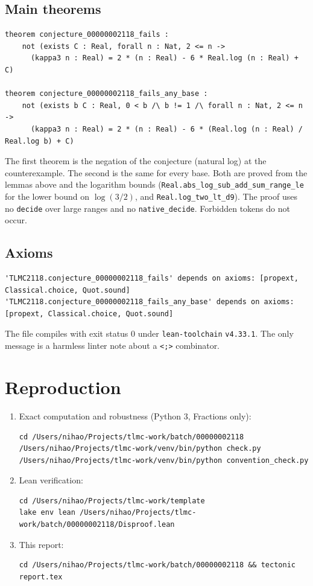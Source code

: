 \documentclass[11pt]{article}
\theoremstyle{definition}
\theoremstyle{plain}
\begin{document}
\subsection*{Main theorems}
\begin{lstlisting}
theorem conjecture_00000002118_fails :
    not (exists C : Real, forall n : Nat, 2 <= n ->
      (kappa3 n : Real) = 2 * (n : Real) - 6 * Real.log (n : Real) + C)

theorem conjecture_00000002118_fails_any_base :
    not (exists b C : Real, 0 < b /\ b != 1 /\ forall n : Nat, 2 <= n ->
      (kappa3 n : Real) = 2 * (n : Real) - 6 * (Real.log (n : Real) / Real.log b) + C)
\end{lstlisting}

\noindent The first theorem is the negation of the conjecture (natural log) at the counterexample. The second is the same
for every base. Both are proved from the lemmas above and the logarithm bounds
(\texttt{Real.abs\_log\_sub\_add\_sum\_range\_le} for the lower bound on $\log(3/2)$, and \texttt{Real.log\_two\_lt\_d9}).
The proof uses no \texttt{decide} over large ranges and no \texttt{native\_decide}. Forbidden tokens do not occur.

\subsection*{Axioms}
\begin{lstlisting}
'TLMC2118.conjecture_00000002118_fails' depends on axioms: [propext, Classical.choice, Quot.sound]
'TLMC2118.conjecture_00000002118_fails_any_base' depends on axioms: [propext, Classical.choice, Quot.sound]
\end{lstlisting}

\noindent The file compiles with exit status 0 under \texttt{lean-toolchain} \texttt{v4.33.1}. The only message is a
harmless linter note about a \texttt{<;>} combinator.

\section{Reproduction}

\begin{enumerate}
\item Exact computation and robustness (Python 3, Fractions only):
\begin{lstlisting}
cd /Users/nihao/Projects/tlmc-work/batch/00000002118
/Users/nihao/Projects/tlmc-work/venv/bin/python check.py
/Users/nihao/Projects/tlmc-work/venv/bin/python convention_check.py
\end{lstlisting}
\item Lean verification:
\begin{lstlisting}
cd /Users/nihao/Projects/tlmc-work/template
lake env lean /Users/nihao/Projects/tlmc-work/batch/00000002118/Disproof.lean
\end{lstlisting}
\item This report:
\begin{lstlisting}
cd /Users/nihao/Projects/tlmc-work/batch/00000002118 && tectonic report.tex
\end{lstlisting}
\end{enumerate}
\end{document}
